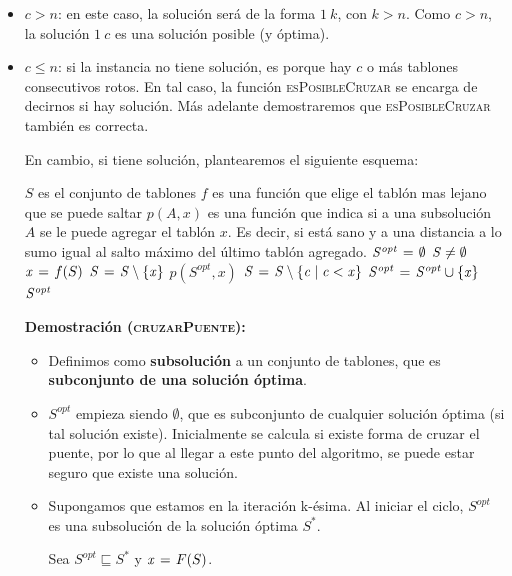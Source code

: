 \begin{itemize}
  \item $c > n$: en este caso, la solución será de la forma $1 \ k$, con $k > n$. Como $c > n$, la
  solución $1 \ c$ es una solución posible (y óptima).

  \item $c \leq n$: si la instancia no tiene solución, es porque hay $c$ o más tablones
  consecutivos rotos. En tal caso, la función \textsc{esPosibleCruzar} se encarga de
  decirnos si hay solución. Más adelante demostraremos que \textsc{esPosibleCruzar}
  también es correcta. \medskip

  En cambio, si tiene solución, plantearemos el siguiente esquema:

  \begin{codebox}
  \li \Comment $S$ es el conjunto de tablones
  \li \Comment $f$ es una función que elige el tablón mas lejano que se puede saltar
  \li \Comment $p(A, x)$ es una función que indica si a una subsolución $A$ se le
  \li \Comment   puede agregar el tablón $x$. Es decir, si está sano y a una distancia
  \li \Comment   a lo sumo igual al salto máximo del último tablón agregado.
  \li $\id{S^{opt}} \gets \emptyset$
  \li \While $\id{S} \neq \emptyset$
  \li     \Do
    			$\id{x} \gets f(S)$
  \li  			$\id{S} \gets \id{S} \setminus \{\id{x}\}$
  \li			\If $p(S^{opt}, x)$
    				\Then
  \li					$\id{S} \gets \id{S} \setminus \{\id{c} \mid \id{c} < \id{x}\}$
  \li					$\id{S^{opt}} \gets \id{S^{opt}} \cup \{\id{x}\}$
    				\End
    		\End
  \li \Return $\id{S^{opt}}$
  \end{codebox}

  \textbf{Demostración (\textsc{cruzarPuente}):}
  \begin{itemize}
    \item Definimos como \textbf{subsolución} a un conjunto de tablones, que
    es \textbf{subconjunto de una solución óptima}.
    \item $S^{opt}$ empieza siendo $\emptyset$, que es subconjunto de cualquier
    solución óptima (si tal solución existe). Inicialmente se calcula si
    existe forma de cruzar el puente, por lo que al llegar a este punto del
    algoritmo, se puede estar seguro que existe una solución.
    \item Supongamos que estamos en la iteración k-ésima. Al iniciar
    el ciclo, $S^{opt}$ es una subsolución de la solución óptima $S^{*}$. \medskip

    Sea $S^{opt} \sqsubseteq S^{*}$ y $\id{x} \gets F(S)$. \medskip


\end{itemize}
\end{itemize}
